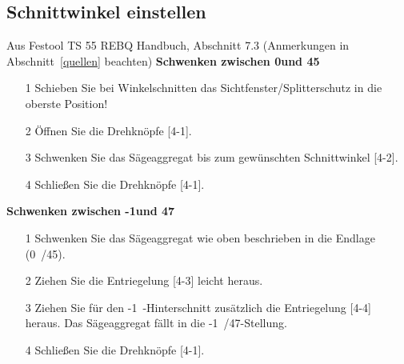 \documentclass{\basedir/fablab-document}
\begin{document}
\subsection{Schnittwinkel einstellen}
\begin{minipage}{70mm}
\begin{leftbar}{Aus Festool TS 55 REBQ Handbuch, Abschnitt 7.3 (Anmerkungen in Abschnitt~\ref{quellen} beachten)}
\textbf{Schwenken zwischen 0\textdegree und 45\textdegree}
\begin{itemize}
\item[1] Schieben Sie bei Winkelschnitten das
Sichtfenster/Splitterschutz in die oberste
Position!
\item[2] Öffnen Sie die Drehknöpfe [4-1].
\item[3] Schwenken Sie das Sägeaggregat bis zum
gewünschten Schnittwinkel [4-2].
\item[4] Schließen Sie die Drehknöpfe [4-1].
\end{itemize}
\textbf{Schwenken zwischen -1\textdegree und 47\textdegree}
\begin{itemize}
\item[1] Schwenken Sie das Sägeaggregat wie oben
beschrieben in die Endlage (0\textdegree\ /45\textdegree).
\item[2] Ziehen Sie die Entriegelung [4-3] leicht heraus.
\item[3] Ziehen Sie für den -1\textdegree\ -Hinterschnitt zusätzlich die Entriegelung [4-4] heraus. Das Sägeaggregat fällt in die -1\textdegree\ /47\textdegree -Stellung.
\item[4] Schließen Sie die Drehknöpfe [4-1].
\end{itemize}
\end{leftbar}
\end{minipage}
\hspace{7mm}
\end{document}
